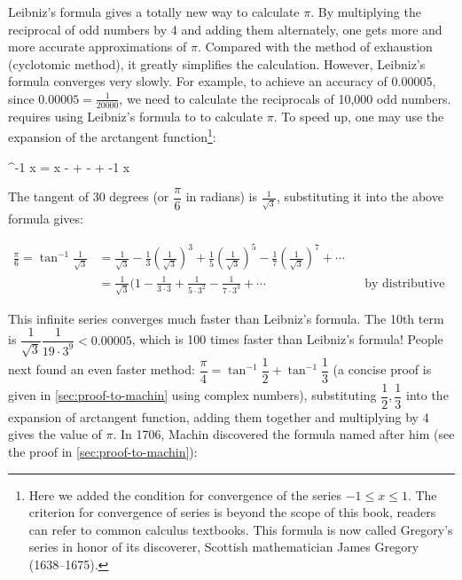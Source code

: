 \documentclass[b5paper]{article}
\begin{document}
Leibniz's formula gives a totally new way to calculate $\pi$. By multiplying the reciprocal of odd numbers by 4 and adding them alternately, one gets more and more accurate approximations of $\pi$. Compared with the method of exhaustion (cyclotomic method), it greatly simplifies the calculation. However, Leibniz's formula converges very slowly. For example, to achieve an accuracy of 0.00005, since $0.00005 = \frac{1}{20000}$, we need to calculate the reciprocals of 10,000 odd numbers.  requires using Leibniz's formula to to calculate $\pi$. To speed up, one may use the expansion of the arctangent function\footnote{Here we added the condition for convergence of the series $-1 \leq x \leq 1$. The criterion for convergence of series is beyond the scope of this book, readers can refer to common calculus textbooks. This formula is now called Gregory's series in honor of its discoverer, Scottish mathematician James Gregory (1638–1675).}:

\be
\tan^{-1} x = x -  +  -  + \dotsb \quad {} -1 \leq x 
\ee

The tangent of 30 degrees (or $\dfrac{\pi}{6}$ in radians) is $\frac{1}{\sqrt{3}}$, substituting it into the above formula gives:

\begin{align*}
\frac{\pi}{6} = \tan^{-1} \frac{1}{\sqrt{3}} &= \frac{1}{\sqrt{3}} - \frac{1}{3}(\frac{1}{\sqrt{3}})^3 + \frac{1}{5}(\frac{1}{\sqrt{3}})^5 - \frac{1}{7}(\frac{1}{\sqrt{3}})^7 + \dotsb \\
  &= \frac{1}{\sqrt{3}}(1 - \frac{1}{3 \cdot 3} + \frac{1}{5 \cdot 3^2} - \frac{1}{7 \cdot 3^3} + \dotsb && \text{by distributive law}
\end{align*}

 \label{sec:machin-formula}
This infinite series converges much faster than Leibniz's formula. The 10th term is $\dfrac{1}{\sqrt{3}}\dfrac{1}{19 \cdot 3^9} < 0.00005$, which is 100 times faster than Leibniz's formula! People next found an even faster method: $\dfrac{\pi}{4} = \tan^{-1} \dfrac{1}{2} + \tan^{-1} \dfrac{1}{3}$ (a concise proof is given in \cref{sec:proof-to-machin} using complex numbers), substituting $\dfrac{1}{2}, \dfrac{1}{3}$ into the expansion of arctangent function, adding them together and multiplying by 4 gives the value of $\pi$. In 1706, Machin discovered the formula named after him (see the proof in \cref{sec:proof-to-machin})\cite{Chronology-pi-2000}:
\end{document}
